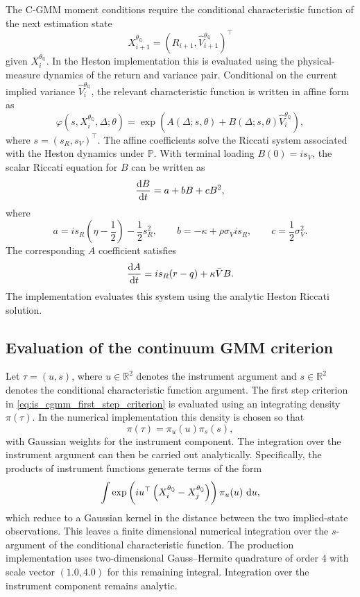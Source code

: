 \documentclass[11pt,a4paper,notitlepage]{article}
\numberwithin{equation}{section}
\begin{document}
The C-GMM moment conditions require the conditional characteristic function of the next estimation state
\[
X_{i+1}^{\theta_{\mathbb Q}}
=
\left(
R_{i+1},
\widehat V_{i+1}^{\theta_{\mathbb Q}}
\right)^\top
\]
given \(X_i^{\theta_{\mathbb Q}}\). In the Heston implementation this is evaluated using the physical-measure dynamics of the return and variance pair. Conditional on the current implied variance \(\widehat V_i^{\theta_{\mathbb Q}}\), the relevant characteristic function is written in affine form as
\[
\varphi\left(s,X_i^{\theta_{\mathbb Q}},\Delta;\theta\right)
=
\exp\left(
A(\Delta;s,\theta)
+
B(\Delta;s,\theta)
\widehat V_i^{\theta_{\mathbb Q}}
\right),
\label{eq:app_heston_transition_ccf}
\]
where \(s=(s_R,s_V)^\top\). The affine coefficients solve the Riccati system associated with the Heston dynamics under \(\mathbb P\). With terminal loading \(B(0)=is_V\), the scalar Riccati equation for \(B\) can be written as
\[
\frac{\dif B}{\dif t}
=
a+bB+cB^2,
\]
where
\[
a
=
is_R\left(\eta-\frac{1}{2}\right)
-\frac{1}{2}s_R^2,
\qquad
b
=
-\kappa+\rho\sigma_V is_R,
\qquad
c
=
\frac{1}{2}\sigma_V^2 .
\]
The corresponding \(A\) coefficient satisfies
\[
\frac{\dif A}{\dif t}
=
is_R(r-q)+\kappa\bar V B .
\]
The implementation evaluates this system using the analytic Heston Riccati solution.

\subsection{Evaluation of the continuum GMM criterion}

Let \(\tau=(u,s)\), where \(u\in\mathbb R^2\) denotes the instrument argument and \(s\in\mathbb R^2\) denotes the conditional characteristic function argument. The first step criterion in \eqref{eq:is_cgmm_first_step_criterion} is evaluated using an integrating density \(\pi(\tau)\). In the numerical implementation this density is chosen so that
\[
\pi(\tau)=\pi_u(u)\pi_s(s),
\]
with Gaussian weights for the instrument component. The integration over the instrument argument can then be carried out analytically. Specifically, the products of instrument functions generate terms of the form
\[
\int
\exp\left(
iu^\top
\left(
X_i^{\theta_{\mathbb Q}}
-
X_j^{\theta_{\mathbb Q}}
\right)
\right)
\pi_u(u)\,\dif u ,
\]
which reduce to a Gaussian kernel in the distance between the two implied-state observations. This leaves a finite dimensional numerical integration over the \(s\)-argument of the conditional characteristic function. The production implementation uses two-dimensional Gauss--Hermite quadrature of order 4 with scale vector $(1.0,4.0)$ for this remaining integral. Integration over the instrument component remains analytic.
\end{document}
